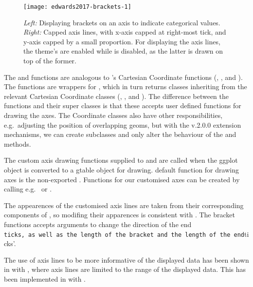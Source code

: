 \begin{figure}[h!]


\texttt{[image: edwards2017-brackets-1]} 
\caption{
  \emph{Left:} Displaying brackets on an axis to indicate categorical values.
  \emph{Right:} Capped axis lines, with x-axis capped at right-most tick, and
               y-axis capped by a small proportion.
  For displaying the axis lines, the theme's  are enabled
  while  is disabled, as the latter is drawn on top of the former.
}
\label{fig:brackets}
\end{figure}

The  and  functions are
analogous to 's Cartesian Coordinate functions
(, , and ).
The  functions are wrappers for
, which in turn returns classes inheriting from the
relevant Cartesian Coordinate classes (,
, and ). The difference between the
 functions and their super classes is that these
accepts user defined functions for drawing the axes. The Coordinate
classes also have other responsibilities, e.g.~adjusting the position of
overlapping geoms, but with the  v.2.0.0 extension
mechanisms, we can create subclasses and only alter the behaviour of the
 and  methods.

The custom axis drawing functions supplied to  and
 are called when the ggplot object is converted
to a gtable object for drawing.  default function for
drawing axes is the non-exported . Functions for our
customised axes can be created by calling e.g.~
or .

The appearences of the customised axis lines are taken from their
corresponding components of , so modifing their apparences
is consistent with . The bracket functions accepts
arguments to change the direction of the end
\texttt{ticks\textquotesingle{},\ as\ well\ as\ the\ length\ of\ the\ bracket\ and\ the\ length\ of\ the\ end}ticks'.

The use of axis lines to be more informative of the displayed data has
been shown in \citet[p.\,130]{Tufte2001} with , where
axis lines are limited to the range of the displayed data. This has been
implemented in  \citep{ggthemes} with
.


